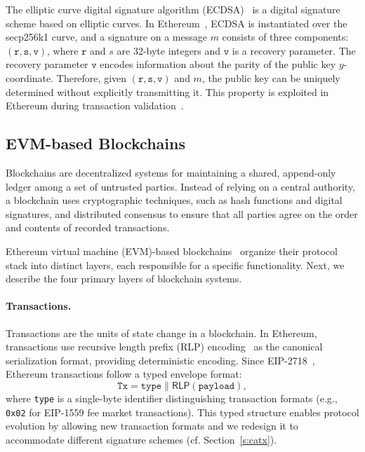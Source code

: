 The elliptic curve digital signature algorithm (ECDSA)~\cite{NIST:FIPS1865} is a digital signature scheme based on elliptic curves.
In Ethereum~\cite{ETH:W14}, ECDSA is instantiated over the secp256k1 curve, and a signature on a message $m$ consists of three components: $(\texttt{r}, \texttt{s}, \texttt{v})$, where $\texttt{r}$ and $s$ are 32-byte integers and $\texttt{v}$ is a recovery parameter.
The recovery parameter $\texttt{v}$ encodes information about the parity of the public key $y$-coordinate. 
Therefore, given $(\texttt{r}, \texttt{s}, \texttt{v})$ and $m$, the public key can be uniquely determined without explicitly transmitting it.
This property is exploited in Ethereum during transaction validation~\cite[Appendix F]{ETH:W14}.


\subsection{EVM-based Blockchains}

Blockchains are decentralized systems for maintaining a shared, append-only ledger among a set of untrusted parties. 
Instead of relying on a central authority, a blockchain uses cryptographic techniques, such as hash functions and digital signatures, and distributed consensus to ensure that all parties agree on the order and contents of recorded transactions. 

Ethereum virtual machine (EVM)-based blockchains~\cite{ETH:BU13} organize their protocol stack into distinct layers, each responsible for a specific functionality.
Next, we describe the four primary layers of blockchain systems.

\paragraph{Transactions.}
Transactions are the units of state change in a blockchain.
In Ethereum, transactions use recursive length prefix (RLP) encoding~\cite[Appendix B]{ETH:W14} as the canonical serialization format, providing deterministic encoding.
Since EIP-2718~\cite{eip2718}, Ethereum transactions follow a typed envelope format:
\begin{equation*}
\texttt{Tx} = \texttt{type} \parallel \mathsf{RLP}(\texttt{payload}),
\end{equation*}
where \texttt{type} is a single-byte identifier distinguishing transaction formats (e.g., \texttt{0x02} for EIP-1559 fee market transactions).
This typed structure enables protocol evolution by allowing new transaction formats and we redesign it to accommodate different signature schemes (cf. Section~\ref{s:catx}).

